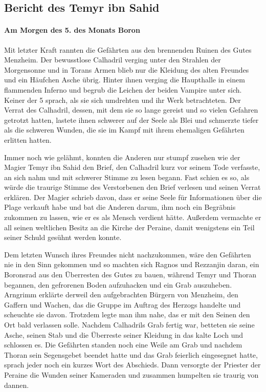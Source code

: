 \documentclass[11pt]{scrreprt}
\begin{document}
\subsection{Bericht des Temyr ibn Sahid}

\paragraph{Am Morgen des 5. des Monats Boron}
Mit letzter Kraft rannten die Gefährten aus den brennenden Ruinen des Gutes Menzheim. Der bewusstlose Calhadril verging unter den Strahlen der Morgensonne und in Torans Armen blieb nur die Kleidung des alten Freundes und ein Häufchen Asche übrig. Hinter ihnen verging die Haupthalle in einem flammenden Inferno und begrub die Leichen der beiden Vampire unter sich. Keiner der 5 sprach, als sie sich umdrehten und ihr Werk betrachteten. Der Verrat des Calhadril, dessen, mit dem sie so lange gereist und so vielen Gefahren getrotzt hatten, lastete ihnen schwerer auf der Seele als Blei und schmerzte tiefer als die schweren Wunden, die sie im Kampf mit ihrem ehemaligen Gefährten erlitten hatten.\par
Immer noch wie gelähmt, konnten die Anderen nur stumpf zusehen wie der Magier Temyr ibn Sahid den Brief, den Calhadril kurz vor seinem Tode verfasste, an sich nahm und mit schwerer Stimme zu lesen begann. Fast schien es so, als würde die traurige Stimme des Verstorbenen den Brief verlesen und seinen Verrat erklären. Der Magier schrieb davon, dass er seine Seele für Informationen über die Plage verkauft habe und bat die Anderen darum, ihm noch ein Begräbnis zukommen zu lassen, wie er es als Mensch verdient hätte. Außerdem vermachte er all seinen weltlichen Besitz an die Kirche der Peraine, damit wenigstens ein Teil seiner Schuld gesühnt werden konnte.\par
Dem letzten Wunsch ihres Freundes nicht nachzukommen, wäre den Gefährten nie in den Sinn gekommen und so machten sich Ragnos und Rezzanjin daran, ein Boronsrad aus den Überresten des Gutes zu bauen, während Temyr und Thoran begannen, den gefrorenen Boden aufzuhacken und ein Grab auszuheben. Arngrimm erklärte derweil den aufgebrachten Bürgern von Menzheim, den Gaffern und Wachen, das die Gruppe im Auftrag des Herzogs handelte und scheuchte sie davon. Trotzdem legte man ihm nahe, das er mit den Seinen den Ort bald verlassen solle. Nachdem Calhadrils Grab fertig war, betteten sie seine Asche, seinen Stab und die Überreste seiner Kleidung in das kalte Loch und schlossen es. Die Gefährten standen noch eine Weile am Grab und nachdem Thoran sein Segensgebet beendet hatte und das Grab feierlich eingesegnet hatte, sprach jeder noch ein kurzes Wort des Abschieds. Dann versorgte der Priester der Peraine die Wunden seiner Kameraden und zusammen humpelten sie traurig von dannen.\par
\end{document}
